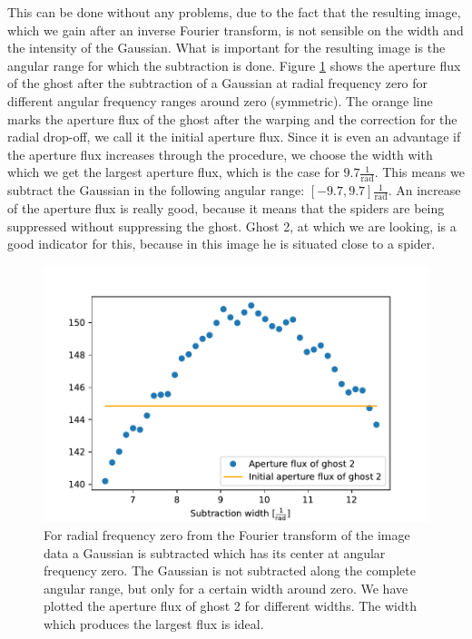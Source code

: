 This can be done without any problems, due to the fact that the resulting image, which we gain after an inverse Fourier transform, is not sensible on the width and the intensity of the Gaussian. What is important for the resulting image is the angular range for which the subtraction is done. Figure \ref{fig:rad0_diffsubwidths} shows the aperture flux of the ghost after the subtraction of a Gaussian at radial frequency zero for different angular frequency ranges around zero (symmetric). The orange line marks the aperture flux of the ghost after the warping and the correction for the radial drop-off, we call it the initial aperture flux. Since it is even an advantage if the aperture flux increases through the procedure, we choose the width with which we get the largest aperture flux, which is the case for $9.7 \frac{1}{\mathrm{rad}}$. This means we subtract the Gaussian in the following angular range: $[-9.7, 9.7] \frac{1}{\mathrm{rad}}$. An increase of the aperture flux is really good, because it means that the spiders are being suppressed without suppressing the ghost. Ghost 2, at which we are looking, is a good indicator for this, because in this image he is situated close to a spider.
\begin{figure}[H]
	\centering
		\includegraphics[width=1.0\textwidth]{pics/rad0_diffsubwidths.pdf}
		\caption{For radial frequency zero from the Fourier transform of the image data a Gaussian is subtracted which has its center at angular frequency zero. The Gaussian is not subtracted along the complete angular range, but only for a certain width around zero. We have plotted the aperture flux of ghost 2 for different widths. The width which produces the largest flux is ideal.}
		\label{fig:rad0_diffsubwidths}
\end{figure}

